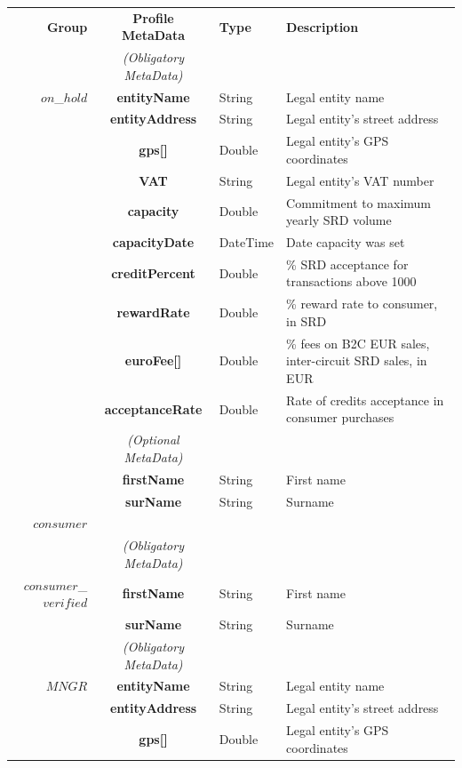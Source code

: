 \setlength{\tabcolsep}{5pt}
\begin{table}[H]
\begin{centering}
\small
{
\begin{tabular}{ r | c | l | l }
\hline
\textbf{Group}	& {\bf Profile MetaData} & {\bf Type} & {\bf Description} \\
\Xhline{1.5pt}
			& \emph{(Obligatory MetaData)} & & \\
\cline{2-2}
$on$\_$hold$	& {\bf entityName}			&String	& Legal entity name \\
			& {\bf entityAddress}			&String	& Legal entity's street address \\
			& {\bf gps[]}				&Double	& Legal entity's GPS coordinates \\
			& {\bf VAT}				&String	& Legal entity's VAT number \\
			& {\bf capacity}				&Double	& Commitment to maximum yearly SRD volume \\
			& {\bf capacityDate}			&DateTime & Date capacity was set \\
			& {\bf creditPercent}			&Double	& \% SRD acceptance for transactions above 1000 \\
			& {\bf rewardRate}			&Double	& \% reward rate to consumer, in SRD \\
			& {\bf euroFee[]}			&Double	& \% fees on B2C EUR sales, inter-circuit SRD sales, in EUR \\			& {\bf acceptanceRate}		&Double	& Rate of credits acceptance in consumer purchases\\
\cline{2-2}
			 & \emph{(Optional MetaData)}& & \\
\cline{2-2}
			& {\bf firstName}			&String	& First name \\
			& {\bf surName}			&String	& Surname \\
\Xhline{1.5pt}
$consumer$	& 	& &  \\
\Xhline{1.5pt}
			& \emph{(Obligatory MetaData)} & & \\
\cline{2-2}
$consumer$\_$verified$ & {\bf firstName}			&String	& First name \\
			& {\bf surName}			&String	& Surname \\
\Xhline{1.5pt}
			& \emph{(Obligatory MetaData)} & & \\
\cline{2-2}
$MNGR$ 		& {\bf entityName}			&String	& Legal entity name \\
			& {\bf entityAddress}			&String	& Legal entity's street address \\
			& {\bf gps[]}				&Double	& Legal entity's GPS coordinates \\

\end{tabular}}
\end{centering}
\end{table}
